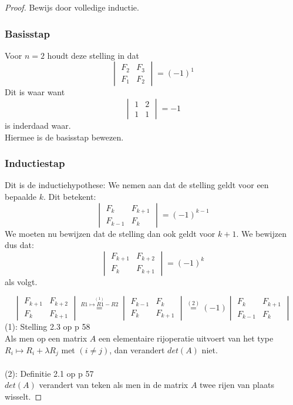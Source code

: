 \documentclass[lineaire_algebra_oplossingen.tex]{subfiles}
\begin{document}
\begin{proof}
Bewijs door volledige inductie.
\subsubsection*{Basisstap}
Voor $n=2$ houdt deze stelling in dat
\[
\begin{vmatrix}
F_{2}   & F_{3}\\
F_{1} & F_{2}
\end{vmatrix}
=
(-1)^{1}
\]
Dit is waar want
\[
\begin{vmatrix}
1 & 2\\
1 & 1
\end{vmatrix}
=
-1
\]
is inderdaad waar.\\
Hiermee is de basisstap bewezen.

\subsubsection*{Inductiestap}
Dit is de inductiehypothese: We nemen aan dat de stelling geldt voor een bepaalde $k$. Dit betekent:
\[
\begin{vmatrix}
F_{k}   & F_{k+1}\\
F_{k-1} & F_{k}
\end{vmatrix}
=
(-1)^{k-1}
\]
We moeten nu bewijzen dat de stelling dan ook geldt voor $k+1$.
We bewijzen dus dat:
\[
\begin{vmatrix}
F_{k+1}   & F_{k+2}\\
F_{k} & F_{k+1}
\end{vmatrix}
=
(-1)^{k}
\]
als volgt.

\[
\begin{vmatrix}
F_{k+1}   & F_{k+2}\\
F_{k} & F_{k+1}
\end{vmatrix}
\overset{\overset{(1)}{R1 \longmapsto R1-R2}}{=}
\begin{vmatrix}
F_{k-1}   & F_{k}\\
F_{k} & F_{k+1}
\end{vmatrix}
\overset{(2)}{=}
(-1)
\begin{vmatrix}
F_{k} & F_{k+1}\\
F_{k-1}   & F_{k}
\end{vmatrix}
\]
(1): Stelling 2.3 op p 58\\
Als men op een matrix $A$ een elementaire rijoperatie uitvoert van het type $R_{i} \longmapsto R_{i}+\lambda R_{j}$ met $(i \neq j)$, dan verandert $det(A)$ niet.\\\\
(2): Definitie 2.1 op p 57\\
$det(A)$ verandert van teken als men in de matrix $A$ twee rijen van plaats wisselt.


\end{proof}
\end{document}
